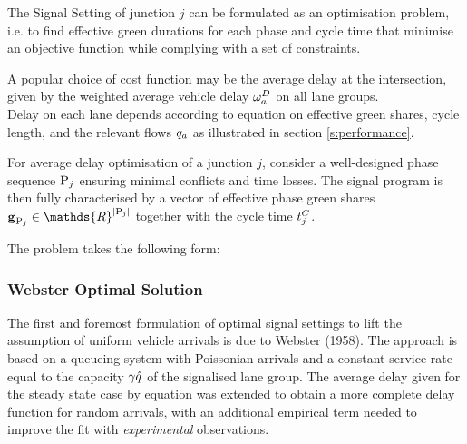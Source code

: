 The Signal Setting of junction $j$ can be formulated as an optimisation problem, i.e. to find
effective green durations for each phase and cycle time that minimise an objective function while complying with a set of constraints.

A popular choice of cost function may be the average delay at the intersection, given by the weighted average vehicle delay $\omega_{a}^{D}$ on all lane groups.\\Delay on each lane depends according to equation  on effective green shares, cycle length, and the relevant flows $q_a$ as illustrated in section \ref{s:performance}.

For average delay optimisation of a junction $j$, consider a well-designed phase sequence $\mathrm{P}_j$ ensuring minimal conflicts and time losses. The signal program is then fully characterised by a vector of effective phase green shares $\grenvec \in \mathds{R}^{|\phaset_j|}$ together with the cycle time $t_{j}^C$.

The problem takes the following form:


\subsubsection*{Webster Optimal Solution}
The first and foremost formulation of optimal signal settings to lift the assumption of uniform vehicle arrivals is due to Webster (1958). The approach is based on a queueing system with Poissonian arrivals and a constant service rate equal to the capacity $\gamma_{} \hat{q}$ of the signalised lane group.
The average delay given for the steady state case by equation  was extended to obtain a more complete delay function for random arrivals, with an additional empirical term needed to
improve the fit with \emph{experimental} observations.

